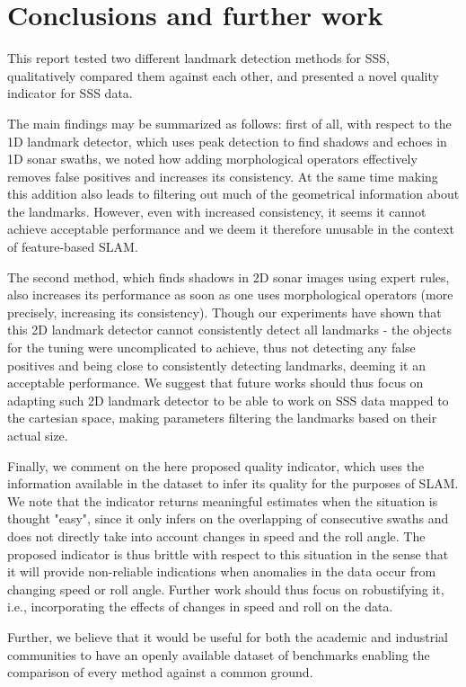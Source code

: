 \chapter{Conclusions and further work}

This report tested two different landmark detection methods for SSS, qualitatively compared them against each other, and presented a novel quality indicator for SSS data. 

The main findings may be summarized as follows: first of all, with respect to the 1D landmark detector, which uses peak detection to find shadows and echoes in 1D sonar swaths, we noted how adding morphological operators effectively removes false positives and increases its consistency. At the same time making this addition also leads to filtering out much of the geometrical information about the landmarks. However, even with increased consistency, it seems it cannot achieve acceptable performance and we deem it therefore unusable in the context of feature-based SLAM.

The second method, which finds shadows in 2D sonar images using expert rules, also increases its performance as soon as one uses morphological operators (more precisely, increasing its consistency). Though our experiments have shown that this 2D landmark detector cannot consistently detect all landmarks - the objects for the tuning were uncomplicated to achieve, thus not detecting any false positives and being close to consistently detecting landmarks, deeming it an acceptable performance. We suggest that future works should thus focus on adapting such 2D landmark detector to be able to work on SSS data mapped to the cartesian space, making parameters filtering the landmarks based on their actual size. 

Finally, we comment on the here proposed quality indicator, which uses the information available in the dataset to infer its quality for the purposes of SLAM. We note that the indicator returns meaningful estimates when the situation is thought "easy", since it only infers on the overlapping of consecutive swaths and does not directly take into account changes in speed and the roll angle. The proposed indicator is thus brittle with respect to this situation in the sense that it will provide non-reliable indications when anomalies in the data occur from changing speed or roll angle. Further work should thus focus on robustifying it, i.e., incorporating the effects of changes in speed and roll on the data. 

Further, we believe that it would be useful for both the academic and industrial communities to have an openly available dataset of benchmarks enabling the comparison of every method against a common ground.







